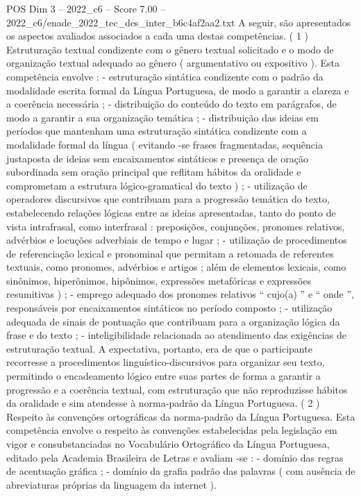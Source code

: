\begin{textsample}{POS Dim 3 – 2022\_c6 – Score 7.00 – 2022\_c6/enade\_2022\_tec\_des\_inter\_b6c4af2aa2.txt}
A seguir, são apresentados os aspectos avaliados associados a cada uma destas competências. ( 1 ) Estruturação textual condizente com o gênero textual solicitado e o modo de organização textual adequado ao gênero ( argumentativo ou expositivo ).
Esta competência envolve : - estruturação sintática condizente com o padrão da modalidade escrita formal da Língua Portuguesa, de modo a garantir a clareza e a coerência necessária ; - distribuição do conteúdo do texto em parágrafos, de modo a garantir a sua organização temática ; - distribuição das ideias em períodos que mantenham uma estruturação sintática condizente com a modalidade formal da língua ( evitando -se frases fragmentadas, sequência justaposta de ideias sem encaixamentos sintáticos e presença de oração subordinada sem oração principal que reflitam hábitos da oralidade e comprometam a estrutura lógico-gramatical do texto ) ; - utilização de operadores discursivos que contribuam para a progressão temática do texto, estabelecendo relações lógicas entre as ideias apresentadas, tanto do ponto de vista intrafrasal, como interfrasal : preposições, conjunções, pronomes relativos, advérbios e locuções adverbiais de tempo e lugar ; - utilização de procedimentos de referenciação lexical e pronominal que permitam a retomada de referentes textuais, como pronomes, advérbios e artigos ; além de elementos lexicais, como sinônimos, hiperônimos, hipônimos, expressões metafóricas e expressões resumitivas ) ; - emprego adequado dos pronomes relativos “ cujo(a) ” e “ onde ”, responsáveis por encaixamentos sintáticos no período composto ; - utilização adequada de sinais de pontuação que contribuam para a organização lógica da frase e do texto ; - inteligibilidade relacionada ao atendimento das exigências de estruturação textual.
A expectativa, portanto, era de que o participante recorresse a procedimentos linguístico-discursivos para organizar seu texto, permitindo o encadeamento lógico entre suas partes de forma a garantir a progressão e a coerência textual, com estruturação que não reproduzisse hábitos da oralidade e sim atendesse à norma-padrão da Língua Portuguesa. ( 2 ) Respeito às convenções ortográficas da norma-padrão da Língua Portuguesa.
Esta competência envolve o respeito às convenções estabelecidas pela legislação em vigor e consubstanciadas no Vocabulário Ortográfico da Língua Portuguesa, editado pela Academia Brasileira de Letras e avaliam -se : - domínio das regras de acentuação gráfica ; - domínio da grafia padrão das palavras ( com ausência de abreviaturas próprias da linguagem da internet ).

\end{textsample}
